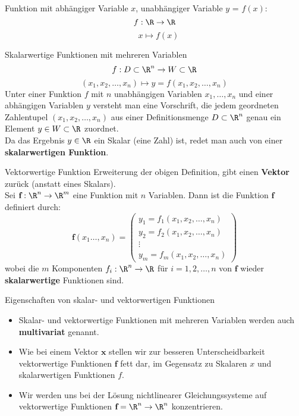 \begin{lemma}{Funktion} mit abhängiger Variable $x$, unabhängiger Variable $y$ = $f(x)$:
    $$f: \R \to \R$$
    $$\quad x \mapsto f(x)$$
\end{lemma}

\begin{definition}{Skalarwertige Funktionen mit mehreren Variablen}
    $$f: D \subset \R^n \to W \subset \R$$
    $$(x_1, x_2, \ldots, x_n) \mapsto y = f(x_1, x_2, \ldots, x_n)$$
    Unter einer Funktion $f$ mit $n$ unabhängigen Variablen $x_1, \ldots, x_n$ und einer abhängigen Variablen $y$ versteht man eine Vorschrift, 
    die jedem geordneten Zahlentupel $(x_1, x_2, \ldots, x_n)$ aus einer Definitionsmenge $D \subset \R^n$ genau ein Element $y \in W \subset \R$ zuordnet.
    \vspace{2mm} \\
    Da das Ergebnis $y \in \R$ ein Skalar (eine Zahl) ist, redet man auch von einer \textbf{skalarwertigen Funktion}.
\end{definition}

\begin{concept}{Vektorwertige Funktion} Erweiterung der obigen Definition, gibt einen \textbf{Vektor} zurück (anstatt eines Skalars).\\
    Sei $\textbf{f}: \R^n \to \R^m$ eine Funktion mit $n$ Variablen. Dann ist die Funktion $\textbf{f}$ definiert durch:
    $$\textbf{f}(x_1 \ldots, x_n) = \begin{pmatrix} y_1 = f_1(x_1, x_2, \ldots, x_n) \\ y_2 = f_2(x_1, x_2, \ldots, x_n) \\ \vdots \\ y_m = f_m(x_1, x_2, \ldots, x_n) \end{pmatrix}$$
    wobei die $m$ Komponenten $f_i: \R^n \to \R$ für $i = 1, 2, \ldots, n$ von $\textbf{f}$ wieder \textbf{skalarwertige} Funktionen sind.
\end{concept}

\begin{corollary}{Eigenschaften von skalar- und vektorwertigen Funktionen}
    \begin{itemize}
        \item Skalar- und vektorwertige Funktionen mit mehreren Variablen werden auch \textbf{multivariat} genannt.
        \item Wie bei einem Vektor $\textbf{x}$ stellen wir zur besseren Unterscheidbarkeit vektorwertige Funktionen $\textbf{f}$ fett dar, im Gegensatz zu Skalaren $x$ und skalarwertigen Funktionen $f$.
        \item Wir werden uns bei der Lösung nichtlinearer Gleichungssysteme auf vektorwertige Funktionen $\textbf{f} = \R^n \to \R^n$ konzentrieren.
    \end{itemize}
\end{corollary}

